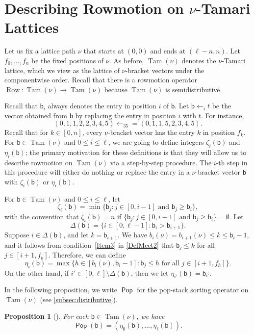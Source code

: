\documentclass[11pt]{amsart}
\DeclareMathOperator{\Pop}{\mathsf{Pop}}
\newtheorem{proposition}[theorem]{Proposition}
\theoremstyle{definition}
\DeclareMathOperator{\Tam}{Tam}
\DeclareMathOperator{\row}{Row}
\begin{document}
\section{Describing Rowmotion on $\nu$-Tamari Lattices}\label{sec:describing}
Let us fix a lattice path $\nu$ that starts at $(0,0)$ and ends at $(\ell-n,n)$. Let $f_0,\ldots,f_n$ be the fixed positions of $\nu$. As before, $\Tam(\nu)$ denotes the $\nu$-Tamari lattice, which we view as the lattice of $\nu$-bracket vectors under the componentwise order. Recall that there is a rowmotion operator $\row\colon\Tam(\nu)\to\Tam(\nu)$ because $\Tam(\nu)$ is semidistributive. 


Recall that $\mathsf b_i$ always denotes the entry in position $i$ of $\mathsf b$. Let $\mathsf b\leftarrow_it$ be the vector obtained from $\mathsf b$ by replacing the entry in position $i$ with $t$. For instance, \[(0,1,1,2,2,3,4,5)\leftarrow_35=(0,1,1,5,2,3,4,5).\] Recall that for $k\in[0,n]$, every $\nu$-bracket vector has the entry $k$ in position $f_k$. For $\mathsf{b}\in\Tam(\nu)$ and $0\leq i\leq \ell$, we are going to define integers $\zeta_i(\mathsf b)$ and $\eta_i(\mathsf b)$; the primary motivation for these definitions is that they will allow us to describe rowmotion on $\Tam(\nu)$ via a step-by-step procedure. The $i$-th step in this procedure will either do nothing or replace the entry in a $\nu$-bracket vector $\mathsf b$ with $\zeta_i(\mathsf b)$ or $\eta_i(\mathsf b)$. 

For $\mathsf{b}\in\Tam(\nu)$ and $0\leq i\leq \ell$, let
\[\zeta_i(\mathsf{b})=\min\{\mathsf b_j:j\in[0,i-1]\text{ and }\mathsf b_j\geq \mathsf b_i\},\] with the convention that $\zeta_i(\mathsf b)=n$ if $\{\mathsf b_j:j\in[0,i-1]\text{ and }\mathsf b_j\geq \mathsf b_i\}=\emptyset$. Let \[\Delta(\mathsf b)=\{i\in[0,\ell-1]:\mathsf b_i>\mathsf b_{i+1}\}.\] Suppose $i\in\Delta(\mathsf b)$, and let $k=\mathsf b_{i+1}$. We have $b_i(\nu)=b_{i+1}(\nu)\leq k\leq \mathsf b_i-1$, and it follows from condition~\eqref{Item3} in \cref{DefMeet2} that $\mathsf b_j\leq k$ for all $j\in[i+1,f_{k}]$. Therefore, we can define \[\eta_i(\mathsf b)=\max\{h\in[b_i(\nu),\mathsf b_i-1]:\mathsf b_j\leq h\text{ for all }j\in[i+1,f_h]\}.\] On the other hand, if $i'\in[0,\ell]\setminus\Delta(\mathsf{b})$, then we let $\eta_{i'}(\mathsf{b})=\mathsf{b}_{i'}$. 


In the following proposition, we write $\Pop$ for the pop-stack sorting operator on $\Tam(\nu)$ (see \cref{subsec:distributive}).

\begin{proposition}[{\cite[Proposition~4.4]{DefantMeeting}}]\label{prop:pop2}
For each $\mathsf b\in \Tam(\nu)$, we have \[\Pop(\mathsf{b})=(\eta_0(\mathsf{b}),\ldots,\eta_\ell(\mathsf{b})).\]    
\end{proposition}
\end{document}

